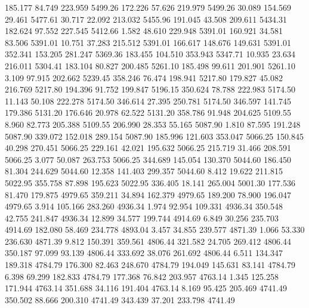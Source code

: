  185.177   84.749  223.959      5499.26
 172.226   57.626  219.979      5499.26
  30.089  154.569   29.461      5477.61
  30.717   22.092  213.032      5455.96
 191.045   43.508  209.611      5434.31
 182.624   97.552  227.545      5412.66
   1.582   48.610  229.948      5391.01
 160.921   34.581   83.506      5391.01
  10.751   37.283  215.512      5391.01
 166.617  148.676  149.631      5391.01
 352.341  153.205  281.247      5369.36
 183.455  104.510  353.943      5347.71
  10.935   23.634  216.011      5304.41
 183.104   80.827  200.485      5261.10
 185.498   99.611  201.901      5261.10
   3.109   97.915  202.662      5239.45
 358.246   76.474  198.941      5217.80
 179.827   45.082  216.769      5217.80
 194.396   91.752  199.847      5196.15
 350.624   78.788  222.983      5174.50
  11.143   50.108  222.278      5174.50
 346.614   27.395  250.781      5174.50
 346.597  141.745  179.386      5131.20
 176.646   20.978   62.522      5131.20
 358.786   91.948  204.625      5109.55
   8.960   82.773  205.388      5109.55
 206.990   28.353   55.165      5087.90
   1.810   87.595  191.248      5087.90
 339.072  152.018  289.154      5087.90
 185.996  121.603  353.047      5066.25
 150.845   40.298  270.451      5066.25
 229.161   42.021  195.632      5066.25
 215.719   31.466  208.591      5066.25
   3.077   50.087  263.753      5066.25
 344.689  145.054  130.370      5044.60
 186.450   81.304  244.629      5044.60
  12.358  141.403  299.357      5044.60
   8.412   19.622  211.815      5022.95
 355.758   87.898  195.623      5022.95
 336.405   18.141  265.004      5001.30
 177.536   81.470  179.875      4979.65
 359.211   34.894  162.379      4979.65
 189.200   78.900  196.047      4979.65
   3.914  105.166  283.260      4936.34
   1.974   92.954  109.331      4936.34
 350.548   42.755  241.847      4936.34
  12.899   34.577  199.744      4914.69
   6.849   30.256  235.703      4914.69
 182.080   58.469  234.778      4893.04
   3.457   34.855  239.577      4871.39
   1.066   53.330  236.630      4871.39
   9.812  150.391  359.561      4806.44
 321.582   24.705  269.412      4806.44
 350.187   97.099   93.139      4806.44
 333.692   38.076  261.692      4806.44
   6.511  134.347  189.318      4784.79
 176.300   82.463  248.670      4784.79
 194.049  145.631   83.141      4784.79
   6.398   69.299  182.833      4784.79
 177.368   76.842  203.957      4763.14
   1.345  125.258  171.944      4763.14
 351.688   34.116  191.404      4763.14
   8.169   95.425  205.469      4741.49
 350.502   88.666  200.310      4741.49
 343.439   37.201  233.798      4741.49
